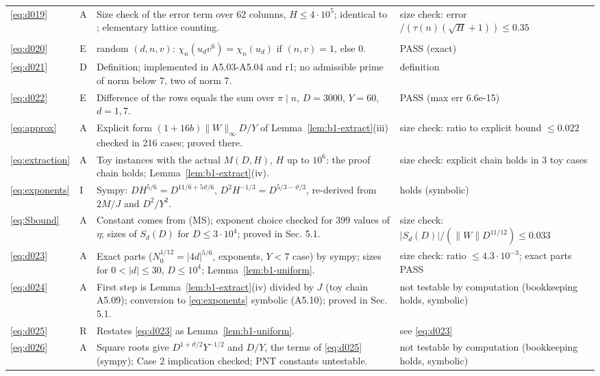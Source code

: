 \documentclass[11pt]{article}
\numberwithin{equation}{section}
\begin{document}
\begin{longtable}{@{}>{\raggedright\arraybackslash}p{1.2cm}>{\centering\arraybackslash}p{0.7cm}>{\raggedright\arraybackslash}p{9.05cm}>{\raggedright\arraybackslash}p{4.3cm}@{}}
\eqref{eq:d019} & A & Size check of the error term over 62 columns, $H\le4\cdot10^5$; identical to \cite[(4.2)]{ZG}; elementary lattice counting. & size check: error$/(\tau(n)(\sqrt H+1))\le0.35$\\
\multicolumn{4}{@{}l}{\emph{Section~5}}\\
\eqref{eq:d020} & E & 3000 random $(d,n,v)$: $\chi_n(u_dv^6)=\chi_n(u_d)$ if $(n,v)=1$, else 0. & PASS (exact)\\
\eqref{eq:d021} & D & Definition; implemented in A5.03-A5.04 and r1; no admissible prime of norm below 7, two of norm 7. & definition\\
\eqref{eq:d022} & E & Difference of the rows equals the sum over $\pi\mid n$, $D=3000$, $Y=60$, $d=1,7$. & PASS (max err 6.6e-15)\\
\eqref{eq:approx} & A & Explicit form $(1+16b)\|W\|_\infty D/Y$ of Lemma~\ref{lem:b1-extract}(iii) checked in 216 cases; proved there. & size check: ratio to explicit bound $\le0.022$\\
\eqref{eq:extraction} & A & Toy instances with the actual $M(D,H)$, $H$ up to $10^6$: the proof chain holds; Lemma~\ref{lem:b1-extract}(iv). & size check: explicit chain holds in 3 toy cases\\
\eqref{eq:exponents} & I & Sympy: $DH^{5/6}=D^{11/6+5\vartheta/6}$, $D^2H^{-1/3}=D^{5/3-\vartheta/3}$, re-derived from $2M/J$ and $D^2/Y^2$. & holds (symbolic)\\
\eqref{eq:Sbound} & A & Constant comes from (MS); exponent choice checked for 399 values of $\eta$; sizes of $S_d(D)$ for $D\le3\cdot10^4$; proved in Sec. 5.1. & size check: $|S_d(D)|/(\|W\|D^{11/12})\le0.033$\\
\eqref{eq:d023} & A & Exact parts ($N_0^{1/12}=|4d|^{5/6}$, exponents, $Y<7$ case) by sympy; sizes for $0<|d|\le30$, $D\le10^4$; Lemma~\ref{lem:b1-uniform}. & size check: ratio $\le4.3\cdot10^{-3}$; exact parts PASS\\
\eqref{eq:d024} & A & First step is Lemma~\ref{lem:b1-extract}(iv) divided by $J$ (toy chain A5.09); conversion to \eqref{eq:exponents} symbolic (A5.10); proved in Sec. 5.1. & not testable by computation (bookkeeping holds, symbolic)\\
\eqref{eq:d025} & R & Restates \eqref{eq:d023} as Lemma~\ref{lem:b1-uniform}. & see \eqref{eq:d023}\\
\eqref{eq:d026} & A & Square roots give $D^{1+\vartheta/2}Y^{-1/2}$ and $D/Y$, the terms of \eqref{eq:d025} (sympy); Case 2 implication checked; PNT constants untestable. & not testable by computation (bookkeeping holds, symbolic)\\

\end{longtable}
\end{document}
